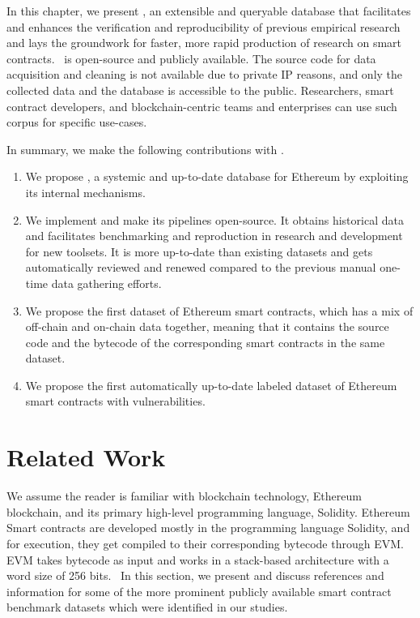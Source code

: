     In this chapter, we present \etherbase, an extensible and queryable database that facilitates and enhances the verification and reproducibility of previous empirical
    research and lays the groundwork for faster, more rapid production of research on smart contracts.
    \etherbase~is open-source and publicly available.
    The source code for data acquisition and cleaning is not available due to private IP reasons, and only the collected data and the database is accessible to the public.
    Researchers, smart contract developers, and blockchain-centric teams and enterprises can use such corpus for specific use-cases.

    In summary, we make the following contributions with \etherbase.
    \begin{enumerate}
        \item We propose \etherbase, a systemic and up-to-date database for Ethereum by exploiting its internal mechanisms.
        \item We implement \etherbase and make its pipelines open-source. It obtains historical data and facilitates benchmarking and reproduction in research and development for new toolsets. It is more up-to-date than existing datasets and gets automatically reviewed and renewed compared to the previous manual one-time data gathering efforts.
        \item We propose the first dataset of Ethereum smart contracts, which has a mix of off-chain and on-chain data together, meaning that it contains the source code and the bytecode of
        the corresponding smart contracts in the same dataset.
        \item We propose the first automatically up-to-date labeled dataset of Ethereum smart contracts with vulnerabilities.
    \end{enumerate}

\section{Related Work}
    \label{sec:relwork}
    We assume the reader is familiar with blockchain technology, Ethereum blockchain, and its primary high-level programming language, Solidity.
    Ethereum Smart contracts are developed mostly in the programming language Solidity, and for execution, they get compiled to their corresponding bytecode through EVM.
    EVM takes bytecode as input and works in a stack-based architecture with a word size of 256 bits.~\cite{liu2019enabling}
    In this section, we present and discuss references and information for some of the more prominent publicly available smart contract benchmark datasets which were identified in our studies.

